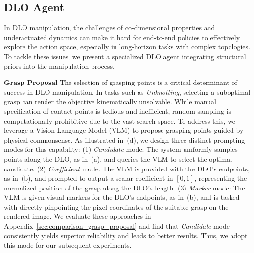 \subsection{DLO Agent}
\label{sec:agent}

In DLO manipulation, the challenges of co-dimensional properties and underactuated dynamics can make it hard for end-to-end policies to effectively explore the action space, especially in long-horizon tasks with complex topologies. To tackle these issues, we present a specialized DLO agent integrating structural priors into the manipulation process.

\textbf{Grasp Proposal} The selection of grasping points is a critical determinant of success in DLO manipulation. In tasks such as \textit{Unknotting}, selecting a suboptimal grasp can render the objective kinematically unsolvable. While manual specification of contact points is tedious and inefficient, random sampling is computationally prohibitive due to the vast search space. To address this, we leverage a Vision-Language Model (VLM) to propose grasping points guided by physical commonsense. As illustrated in~(d), we design three distinct prompting modes for this capability:
(1) \textit{Candidate} mode: The system uniformly samples points along the DLO, as in~(a), and queries the VLM to select the optimal candidate.
(2) \textit{Coefficient} mode: The VLM is provided with the DLO's endpoints, as in~(b), and prompted to output a scalar coefficient in $[0, 1]$, representing the normalized position of the grasp along the DLO's length.
(3) \textit{Marker} mode: The VLM is given visual markers for the DLO's endpoints, as in~(b), and is tasked with directly pinpointing the pixel coordinates of the suitable grasp on the rendered image.
We evaluate these approaches in Appendix~\ref{sec:comparison_grasp_proposal} and find that \textit{Candidate} mode consistently yields superior reliability and leads to better results. Thus, we adopt this mode for our subsequent experiments.

